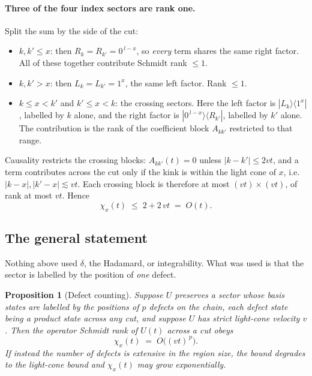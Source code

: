 \documentclass[11pt]{article}
\theoremstyle{plain}
\newtheorem{proposition}{Proposition}
\theoremstyle{remark}
\begin{document}
\paragraph{Three of the four index sectors are rank one.} Split the sum by the
side of the cut:
\begin{itemize}
\item $k,k' \le x$: then $R_k = R_{k'} = 0^{\,l-x}$, so \emph{every} term shares
the same right factor. All of these together contribute Schmidt rank $\le 1$.
\item $k,k' > x$: then $L_k = L_{k'} = 1^{x}$, the same left factor. Rank
$\le 1$.
\item $k \le x < k'$ and $k' \le x < k$: the crossing sectors. Here the left
factor is $|L_k\rangle\langle 1^x|$, labelled by $k$ alone, and the right factor
is $|0^{\,l-x}\rangle\langle R_{k'}|$, labelled by $k'$ alone. The contribution
is the rank of the coefficient block $A_{kk'}$ restricted to that range.
\end{itemize}
Causality restricts the crossing blocks: $A_{kk'}(t) = 0$ unless
$|k-k'| \le 2vt$, and a term contributes across the cut only if the kink is
within the light cone of $x$, i.e.\ $|k-x|, |k'-x| \lesssim vt$. Each crossing
block is therefore at most $(vt)\times(vt)$, of rank at most $vt$. Hence
\begin{equation}
  \boxed{\;\chi_x(t) \;\le\; 2 + 2\,vt \;=\; O(t).\;}
  \label{eq:linear}
\end{equation}

\subsection{The general statement}

Nothing above used $\delta$, the Hadamard, or integrability. What was used is
that the sector is labelled by the position of \emph{one} defect.

\begin{proposition}[Defect counting]
\label{prop:defect}
Suppose $U$ preserves a sector whose basis states are labelled by the positions
of $p$ defects on the chain, each defect state being a product state across any
cut, and suppose $U$ has strict light-cone velocity $v$. Then the operator
Schmidt rank of $U(t)$ across a cut obeys
\[
  \chi_x(t) \;=\; O\big((vt)^{\,p}\big).
\]
If instead the number of defects is extensive in the region size, the bound
degrades to the light-cone bound and $\chi_x(t)$ may grow exponentially.
\end{proposition}
\end{document}
